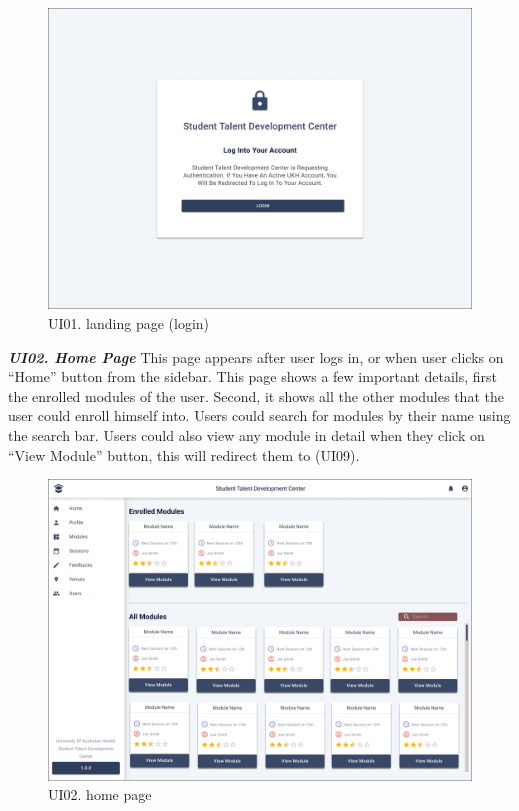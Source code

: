 \begin{justify}
    \begin{figure}[H]
    \centerline{\includegraphics[width=150mm,scale=1]{figures/analysis_and_design/design/UI/1. Landing Page (UI01).png}}
    \caption{UI01. landing page (login)}
    \label{UI01}
    \end{figure}
    \clearpage


    \noindent\textbf{\textit{UI02. Home Page}}\newendline
    This page appears after user logs in, or when user clicks on “Home” button from the sidebar. This page shows a few important details, first the enrolled modules of the user. Second, it shows all the other modules that the user could enroll himself into. Users could search for modules by their name using the search bar. Users could also view any module in detail when they click on “View Module” button, this will redirect them to (UI09).\\

    \begin{figure}[H]
    \centerline{\includegraphics[width=150mm,scale=1]{figures/analysis_and_design/design/UI/2. Home Page (UI02).png}}
    \caption{UI02. home page}
    \label{UI02}
    \end{figure}
    \clearpage



\end{justify}

